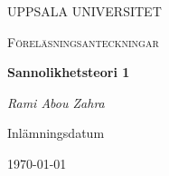 \begin{titlepage}

  \centering
	{\scshape\LARGE UPPSALA UNIVERSITET\par}
	\vspace{1cm}
  {\scshape\Large {Föreläsningsanteckningar} \par}
	\vspace{1.5cm}
  {\huge\bfseries {Sannolikhetsteori 1} \par}
	\vspace{2cm}
	{\Large\itshape Rami Abou Zahra \par}
	\vfill
  \vfill


  {\large Inlämningsdatum}\par
  {\today}

\end{titlepage}
